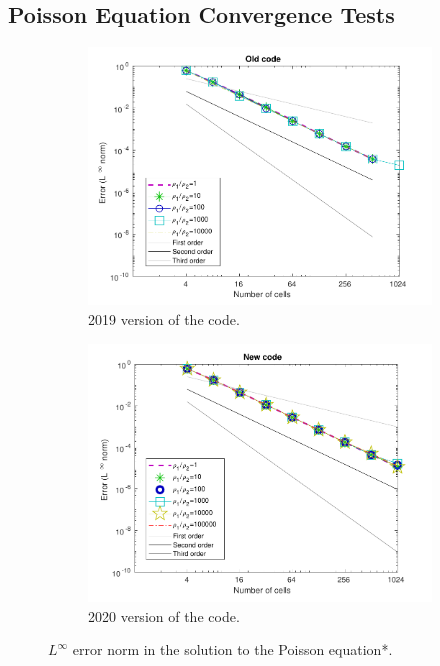 \documentclass[11pt, a4paper, oneside, openany]{book}
\begin{document}
\subsection{Poisson Equation Convergence Tests}\label{Subsection_Poisson_Equation_Convergence_Tests}
\begin{figure}[!ht]
	\centering
	\begin{subfigure}{.5\textwidth}
		\includegraphics[width=1\textwidth]{PoissonConvergence2019Code.pdf}
		\caption[Poisson Convergence 2019 code]{2019 version of the code.}\label{PoissonTest2019}
	\end{subfigure}%
	\begin{subfigure}{.5\textwidth}
		\includegraphics[width=1\textwidth]{PoissonConvergence2020Code.pdf}
		\caption[Poisson Convergence 2020 code]{2020 version of the code.}\label{PoissonTest2020}
	\end{subfigure}
	\caption[Reinitialization CPU Time cost]{$L^{\infty}$ error norm in the solution to the Poisson equation*.}\label{PoissonTest}
\end{figure}\noindent
\end{document}
